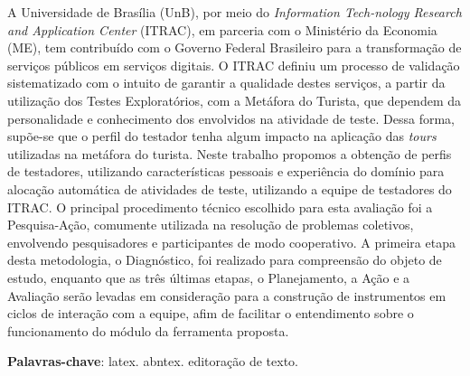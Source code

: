 \begin{resumo}

A Universidade de Brasília (UnB), por meio do \textit{Information Tech-nology Research and Application Center} (ITRAC), em parceria com o Ministério da Economia (ME), tem contribuído com o Governo Federal Brasileiro para a transformação de serviços públicos em serviços digitais. O ITRAC definiu um processo de validação sistematizado com o intuito de garantir a qualidade destes serviços, a partir da utilização dos Testes Exploratórios, com a Metáfora do Turista, que dependem da personalidade e conhecimento dos envolvidos na atividade de teste. Dessa forma, supõe-se que o perfil do testador tenha algum impacto na aplicação das \textit{tours} utilizadas na metáfora do turista. Neste trabalho propomos a obtenção de perfis de testadores, utilizando características pessoais e experiência do domínio para alocação automática de atividades de teste, utilizando a equipe de testadores do ITRAC. O principal procedimento técnico escolhido para esta avaliação foi a Pesquisa-Ação, comumente utilizada na resolução de problemas coletivos, envolvendo pesquisadores e participantes de modo cooperativo. A primeira etapa desta metodologia, o Diagnóstico, foi realizado para compreensão do objeto de estudo, enquanto que as três últimas etapas, o Planejamento, a Ação e a Avaliação serão levadas em consideração para a construção de instrumentos em ciclos de interação com a equipe, afim de facilitar o entendimento sobre o funcionamento do módulo da ferramenta proposta.

 \vspace{\onelineskip}
    
 \noindent
 \textbf{Palavras-chave}: latex. abntex. editoração de texto.
\end{resumo}
    
